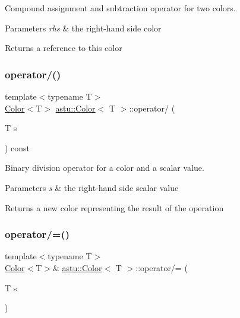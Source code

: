 Compound assignment and subtraction operator for two colors.


\begin{DoxyParams}{Parameters}
{\em rhs} & the right-\/hand side color \\
\hline
\end{DoxyParams}
\begin{DoxyReturn}{Returns}
a reference to this color 
\end{DoxyReturn}
\mbox{\label{classastu_1_1Color_af4b143f6c4c3b15412293a25f05320b2}} 
\subsubsection{\texorpdfstring{operator/()}{operator/()}}
{\footnotesize\ttfamily template$<$typename T$>$ \\
\hyperlink{classastu_1_1Color}{Color}$<$T$>$ \hyperlink{classastu_1_1Color}{astu\+::\+Color}$<$ T $>$\+::operator/ (\begin{DoxyParamCaption}\item[{T}]{s }\end{DoxyParamCaption}) const\hspace{0.3cm}{\ttfamily [inline]}}

Binary division operator for a color and a scalar value.


\begin{DoxyParams}{Parameters}
{\em s} & the right-\/hand side scalar value \\
\hline
\end{DoxyParams}
\begin{DoxyReturn}{Returns}
a new color representing the result of the operation 
\end{DoxyReturn}
\mbox{\label{classastu_1_1Color_a8411cf3d645429dbcdc609a8db010c68}} 
\subsubsection{\texorpdfstring{operator/=()}{operator/=()}}
{\footnotesize\ttfamily template$<$typename T$>$ \\
\hyperlink{classastu_1_1Color}{Color}$<$T$>$\& \hyperlink{classastu_1_1Color}{astu\+::\+Color}$<$ T $>$\+::operator/= (\begin{DoxyParamCaption}\item[{T}]{s }\end{DoxyParamCaption})\hspace{0.3cm}{\ttfamily [inline]}}


